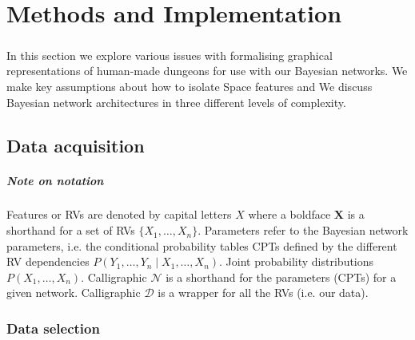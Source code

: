 \documentclass{UoYCSproject}
\begin{document}
\chapter{Methods and Implementation}

\paragraph{}
In this section we explore various issues with formalising graphical representations of human-made dungeons for use with our Bayesian networks. We make key assumptions about how to isolate Space features and 
We discuss Bayesian network architectures in three different levels of complexity.

\section{Data acquisition}

\paragraph{Note on notation}
Features or RVs are denoted by capital letters \(X\) where a boldface \(\boldsymbol{X}\) is a shorthand for a set of RVs \(\{X_1, \ldots, X_n\}\).
Parameters refer to the Bayesian network parameters, i.e. the conditional probability tables CPTs defined by the different RV dependencies \(P(Y_1, \ldots, Y_n \mid X_1, \ldots , X_n)\).
Joint probability distributions \(P(X_1, \ldots , X_n)\).
Calligraphic \(\mathcal{N}\) is a shorthand for the parameters (CPTs) for a given network.
Calligraphic \(\mathcal{D}\) is a wrapper for all the RVs (i.e. our data).

\subsection{Data selection} %
\end{document}
